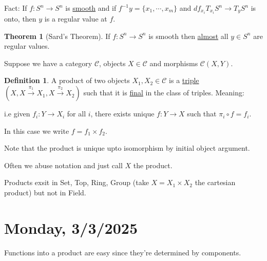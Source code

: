 \documentclass{article}
\theoremstyle{definition}
\newtheorem*{definition}{Definition}
\newtheorem{theorem}{Theorem}
\begin{document}
    Fact: If \(f: S^n \to S^n\) is \underline{smooth} and if \(f ^{-1} y = \{ x_1, \cdots , x_m \} \) and \(df_{x_i} T_{x_i}S^n \to T_y S^n\) is onto, then \(y\) is a regular value at \(f\).

    \begin{theorem}
        [Sard's Theorem] If \(f: S^n \to S^n\) is smooth then \underline{almost} all \(y\in S^n\) are regular values.
    \end{theorem}

    Suppose we have a category \(\mathcal{C}\), objects \(X\in \mathcal{C}\) and morphisms \(\mathcal{C}(X,Y)\).

    \begin{definition}
        A product of two objects \(X_1,X_2\in \mathcal{C}\) is a \underline{triple} \((X, X \xrightarrow{\pi_1} X_1, X\xrightarrow{\pi_2} X_2)\) such that it is \underline{final} in the class of triples. Meaning:
        
        \begin{center}
        \end{center}

        i.e given \(f_i: Y \to X_i\) for all \(i\), there exists unique \(f: Y \to X\) such that \(\pi_i \circ f = f_i\).
        
        In this case we write \(f = f_1 \times f_2\).

        Note that the product is unique upto isomorphism by initial object argument.

        Often we abuse notation and just call \(X\) the product.

    \end{definition}

    Products exsit in Set, Top, Ring, Group (take \(X = X_1 \times X_2\) the cartesian product) but not in Field.

    \section*{Monday, 3/3/2025}

    Functions into a product are easy since they're determined by components.
\end{document}
